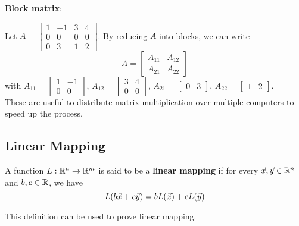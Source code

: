 \documentclass[english, 12pt]{article}
\begin{document}
\begin{defn}
\textbf{Block matrix}:
\begin{exmp}
Let $A = \begin{bmatrix} 1 & -1 & 3 & 4 \\ 0 & 0 & 0 & 0 \\ 0 & 3 & 1 & 2 \end{bmatrix} $. By reducing $A$ into blocks, we can write
\[ A = \begin{bmatrix} A_{11} & A_{12} \\ A_{21} & A_{22} \end{bmatrix} \]
with $A_{11} = \begin{bmatrix} 1 & -1 \\ 0 & 0 \end{bmatrix}$, $A_{12} = \begin{bmatrix} 3 & 4 \\ 0 & 0 \end{bmatrix}$, 
$A_{21} = \begin{bmatrix} 0 & 3 \end{bmatrix} $, $A_{22} = \begin{bmatrix} 1 & 2 \end{bmatrix}$. \\
These are useful to distribute matrix multiplication over multiple computers to speed up the process.
\end{exmp}
\end{defn}

\subsection{Linear Mapping}

\begin{defn}
A function $L : {\mathbb{R}}^n \rightarrow {\mathbb{R}}^m$ is said to be a \textbf{linear mapping} if for every $\vec{x},\vec{y} \in {\mathbb{R}}^n$ and $b,c \in {\mathbb{R}}$, we have
\[ L(b\vec{x} + c \vec{y}) = bL(\vec{x}) + cL(\vec{y})\]
\end{defn}
\begin{note}
This definition can be used to prove linear mapping.
\end{note}
\end{document}
